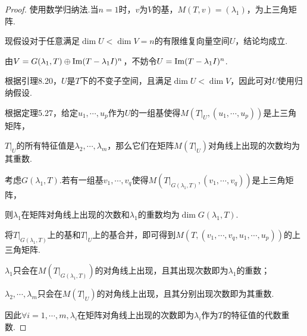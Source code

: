 \begin{proof}
    使用数学归纳法.当\(n=1\)时，\(v\)为\(V\)的基，\(M(T,v)=(\lambda_1)\)，为上三角矩阵.

    现假设对于任意满足\(\dim U<\dim V=n\)的有限维复向量空间\(U\)，结论均成立.
    
    由\(V=G(\lambda_1,T) \oplus \operatorname{Im} (T-\lambda_1 I)^n\)，不妨令\(U=\operatorname{Im} (T-\lambda_1 I)^n\).
    
    根据引理8.20，\(U\)是\(T\)下的不变子空间，且满足\(\dim U<\dim V\)，因此可对\(U\)使用归纳假设.
    
    根据定理5.27，给定\(u_1,\cdots,u_p\)作为\(U\)的一组基使得\(M(T|_U,(u_1,\cdots,u_p))\)是上三角矩阵，
    
    \(T|_U\)的所有特征值是\(\lambda_2,\cdots,\lambda_m\)，那么它们在矩阵\(M(T|_U)\)对角线上出现的次数均为其重数.
    
    考虑\(G(\lambda_1,T)\).若有一组基\(v_1,\cdots,v_q\)使得\(M(T|_{G(\lambda_1,T)},(v_1,\cdots,v_q))\)是上三角矩阵，
    
    则\(\lambda_1\)在矩阵对角线上出现的次数和\(\lambda_1\)的重数均为\(\dim G(\lambda_1,T)\).
    
    将\(T|_{G(\lambda_1,T)}\)上的基和\(T|_U\)上的基合并，即可得到\(M(T,(v_1,\cdots,v_q,u_1,\cdots,u_p))\)的上三角矩阵.
    
    \(\lambda_1\)只会在\(M(T|_{G(\lambda_1,T)})\)的对角线上出现，且其出现次数即为\(\lambda_1\)的重数；
    
    \(\lambda_2,\cdots,\lambda_m\)只会在\(M(T|_U)\)的对角线上出现，且其分别出现次数即为其重数.
    
    因此\(\forall i=1,\cdots,m,\lambda_i\)在矩阵对角线上出现的次数即为\(\lambda_i\)作为\(T\)的特征值的代数重数.
\end{proof}

